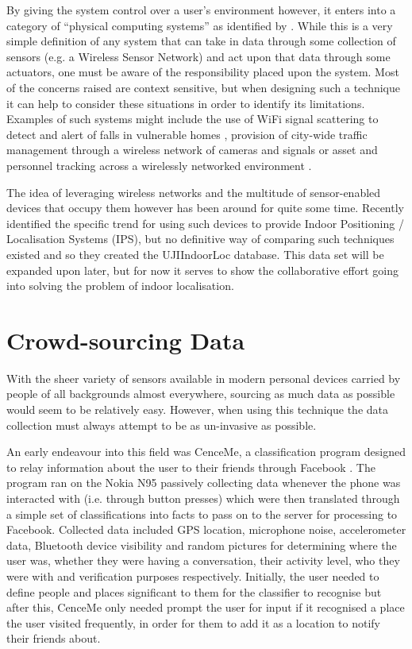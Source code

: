 \documentclass{UoYCSproject}
\begin{document}
            By giving the system control over a user's environment however, it enters into a category of ``physical computing systems'' as identified by \citet{stankovic2005opportunities}. While this is a very simple definition of any system that can take in data through some collection of sensors (e.g. a Wireless Sensor Network) and act upon that data through some actuators, one must be aware of the responsibility placed upon the system. Most of the concerns raised are context sensitive, but when designing such a technique it can help to consider these situations in order to identify its limitations. Examples of such systems might include the use of WiFi signal scattering to detect and alert of falls in vulnerable homes \citep{han2014wifall}, provision of city-wide traffic management through a wireless network of cameras and signals \citep{LATraffic} or asset and personnel tracking across a wirelessly networked environment \citep{Ekahau}.
		
            The idea of leveraging wireless networks and the multitude of sensor-enabled devices that occupy them however has been around for quite some time. Recently \citet{torres2014ujiindoorloc} identified the specific trend for using such devices to provide Indoor Positioning / Localisation Systems (IPS), but no definitive way of comparing such techniques existed and so they created the UJIIndoorLoc database. This data set will be expanded upon later, but for now it serves to show the collaborative effort going into solving the problem of indoor localisation.
                
        \section{Crowd-sourcing Data}
        \label{sec:crowd}
        
            With the sheer variety of sensors available in modern personal devices carried by people of all backgrounds almost everywhere, sourcing as much data as possible would seem to be relatively easy. However, when using this technique the data collection must always attempt to be as un-invasive as possible. 
            
            An early endeavour into this field was CenceMe, a classification program designed to relay information about the user to their friends through Facebook \citep{miluzzo2008sensing}. The program ran on the Nokia N95 passively collecting data whenever the phone was interacted with (i.e. through button presses) which were then translated through a simple set of classifications into facts to pass on to the server for processing to Facebook. Collected data included GPS location, microphone noise, accelerometer data, Bluetooth device visibility and random pictures for determining where the user was, whether they were having a conversation, their activity level, who they were with and verification purposes respectively. Initially, the user needed to define people and places significant to them for the classifier to recognise but after this, CenceMe only needed prompt the user for input if it recognised a place the user visited frequently, in order for them to add it as a location to notify their friends about.
            
\end{document}
